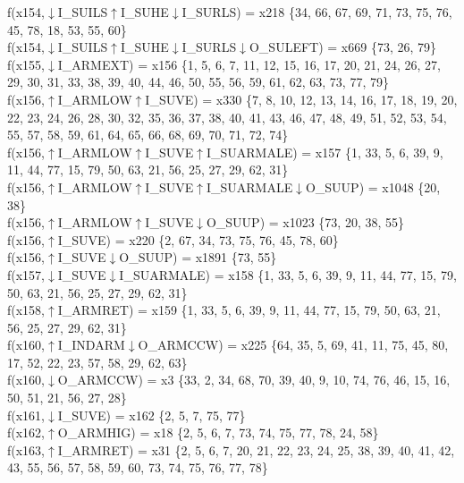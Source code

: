 f(x154,$\downarrow$I\_SUILS$\uparrow$I\_SUHE$\downarrow$I\_SURLS) = x218 \{34, 66, 67, 69, 71, 73, 75, 76, 45, 78, 18, 53, 55, 60\} \\  
f(x154,$\downarrow$I\_SUILS$\uparrow$I\_SUHE$\downarrow$I\_SURLS$\downarrow$O\_SULEFT) = x669 \{73, 26, 79\} \\  
f(x155,$\downarrow$I\_ARMEXT) = x156 \{1, 5, 6, 7, 11, 12, 15, 16, 17, 20, 21, 24, 26, 27, 29, 30, 31, 33, 38, 39, 40, 44, 46, 50, 55, 56, 59, 61, 62, 63, 73, 77, 79\} \\  
f(x156,$\uparrow$I\_ARMLOW$\uparrow$I\_SUVE) = x330 \{7, 8, 10, 12, 13, 14, 16, 17, 18, 19, 20, 22, 23, 24, 26, 28, 30, 32, 35, 36, 37, 38, 40, 41, 43, 46, 47, 48, 49, 51, 52, 53, 54, 55, 57, 58, 59, 61, 64, 65, 66, 68, 69, 70, 71, 72, 74\} \\  
f(x156,$\uparrow$I\_ARMLOW$\uparrow$I\_SUVE$\uparrow$I\_SUARMALE) = x157 \{1, 33, 5, 6, 39, 9, 11, 44, 77, 15, 79, 50, 63, 21, 56, 25, 27, 29, 62, 31\} \\  
f(x156,$\uparrow$I\_ARMLOW$\uparrow$I\_SUVE$\uparrow$I\_SUARMALE$\downarrow$O\_SUUP) = x1048 \{20, 38\} \\  
f(x156,$\uparrow$I\_ARMLOW$\uparrow$I\_SUVE$\downarrow$O\_SUUP) = x1023 \{73, 20, 38, 55\} \\  
f(x156,$\uparrow$I\_SUVE) = x220 \{2, 67, 34, 73, 75, 76, 45, 78, 60\} \\  
f(x156,$\uparrow$I\_SUVE$\downarrow$O\_SUUP) = x1891 \{73, 55\} \\  
f(x157,$\downarrow$I\_SUVE$\downarrow$I\_SUARMALE) = x158 \{1, 33, 5, 6, 39, 9, 11, 44, 77, 15, 79, 50, 63, 21, 56, 25, 27, 29, 62, 31\} \\  
f(x158,$\uparrow$I\_ARMRET) = x159 \{1, 33, 5, 6, 39, 9, 11, 44, 77, 15, 79, 50, 63, 21, 56, 25, 27, 29, 62, 31\} \\  
f(x160,$\uparrow$I\_INDARM$\downarrow$O\_ARMCCW) = x225 \{64, 35, 5, 69, 41, 11, 75, 45, 80, 17, 52, 22, 23, 57, 58, 29, 62, 63\} \\  
f(x160,$\downarrow$O\_ARMCCW) = x3 \{33, 2, 34, 68, 70, 39, 40, 9, 10, 74, 76, 46, 15, 16, 50, 51, 21, 56, 27, 28\} \\  
f(x161,$\downarrow$I\_SUVE) = x162 \{2, 5, 7, 75, 77\} \\  
f(x162,$\uparrow$O\_ARMHIG) = x18 \{2, 5, 6, 7, 73, 74, 75, 77, 78, 24, 58\} \\  
f(x163,$\uparrow$I\_ARMRET) = x31 \{2, 5, 6, 7, 20, 21, 22, 23, 24, 25, 38, 39, 40, 41, 42, 43, 55, 56, 57, 58, 59, 60, 73, 74, 75, 76, 77, 78\} \\  
